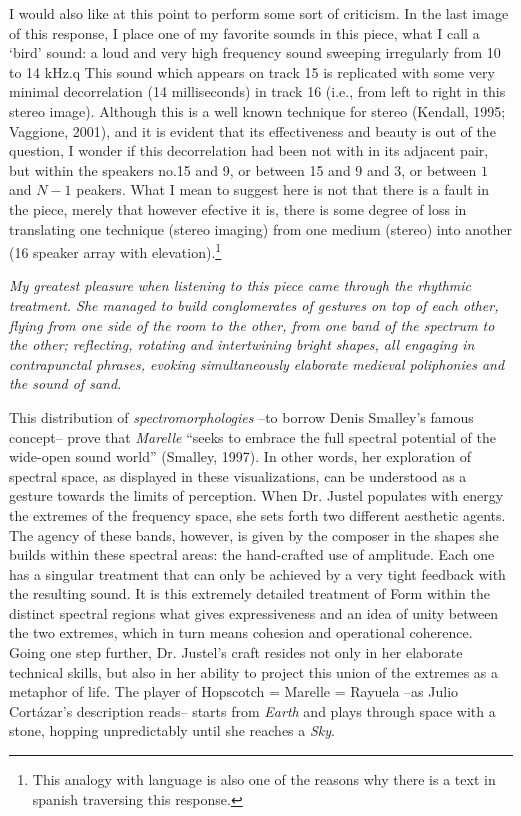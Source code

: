 \documentclass{article}
\begin{document}
I would also like at this point to perform some sort of criticism. In the last image of this response, I place one of my favorite sounds in this piece, what I call a `bird' sound: a loud and very high frequency sound sweeping irregularly from 10 to 14 kHz.q This sound which appears on track 15 is replicated with some very minimal decorrelation (14 milliseconds) in track 16 (i.e., from left to right in this stereo image). Although this is a well known technique for stereo (Kendall, 1995; Vaggione, 2001), and it is evident that its effectiveness and beauty is out of the question, I wonder if this decorrelation had been not with in its adjacent pair, but within the speakers no.15 and 9, or between 15 and 9 and 3, or between $1$ and $N-1$ peakers. What I mean to suggest here is not that there is a fault in the piece, merely that however efective it is, there is some degree of loss in translating one technique (stereo imaging) from one medium (stereo) into another (16 speaker array with elevation).\footnote{This analogy with language is also one of the reasons why there is a text in spanish traversing this response.}

\bigskip


\begin{flushright}
\textit{My greatest pleasure when listening to this piece came through the rhythmic treatment. She managed to build conglomerates of gestures on top of each other, flying from one side of the room to the other, from one band of the spectrum to the other; reflecting, rotating and intertwining bright shapes, all  engaging in contrapunctal phrases, evoking simultaneously elaborate medieval poliphonies and the sound of sand.}
\end{flushright}
\newpage

This distribution of \emph{spectromorphologies} --to borrow Denis Smalley's famous concept-- prove that \textit{Marelle} ``seeks to embrace the full spectral potential of the wide-open sound world'' (Smalley, 1997). In other words, her exploration of spectral space, as displayed in these visualizations, can be understood as a gesture towards the limits of perception. When Dr. Justel populates with energy the extremes of the frequency space, she sets forth two different aesthetic agents. The agency of these bands, however, is given by the composer in the shapes she builds within these spectral areas: the hand-crafted use of amplitude. Each one has a singular treatment that can only be achieved by a very tight feedback with the resulting sound. It is this extremely detailed treatment of Form within the distinct spectral regions what gives expressiveness and an idea of unity between the two extremes, which in turn means cohesion and operational coherence. Going one step further, Dr. Justel's craft resides not only in her elaborate technical skills, but also in her ability to project this union of the extremes as a metaphor of life. The player of Hopscotch = Marelle = Rayuela --as Julio Cort\'{a}zar's description reads-- starts from \emph{Earth} and plays through space with a stone, hopping unpredictably until she reaches a \emph{Sky}.
\end{document}
